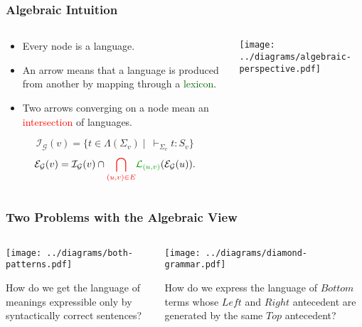 \documentclass{beamer}
\begin{document}
\begin{frame}
  \frametitle{Algebraic Intuition}

  \begin{columns}[c]
    \begin{column}{0.7\textwidth}
      \begin{block}{}
        \begin{itemize}
        \item Every node is a language.
        \item An arrow means that a language is produced from another by
          mapping through a \textcolor{darkgreen}{lexicon}.
        \item Two arrows converging on a node mean an
          \textcolor{red}{intersection} of languages.
        \end{itemize}
      \end{block}

$$
\mathcal{I}_{\mathcal{G}}(v) = \{t \in \Lambda(\Sigma_v)
\mid\ \vdash_{\Sigma_v} t : S_v\}
$$
$$
\mathcal{E}_{\mathcal{G}}(v) = \mathcal{I}_{\mathcal{G}}(v) \cap
\textcolor{red}{\bigcap_{(u,v) \in E}}
\textcolor{darkgreen}{\mathcal{L}_{(u,v)}}(\mathcal{E}_{\mathcal{G}}(u)).
$$
    \end{column}
    \begin{column}{0.3\textwidth}
      \texttt{[image: ../diagrams/algebraic-perspective.pdf]}
    \end{column}
  \end{columns}

\end{frame}


\begin{frame}
  \frametitle{Two Problems with the Algebraic View}

  \begin{columns}[t]
    \begin{column}{0.5\textwidth}
      \begin{center}
        \texttt{[image: ../diagrams/both-patterns.pdf]}
      \end{center}

      How do we get the language of meanings expressible only by
      syntactically correct sentences?
    \end{column}
    \begin{column}{0.5\textwidth}
      \begin{center}
        \texttt{[image: ../diagrams/diamond-grammar.pdf]}
      \end{center}

      How do we express the language of $Bottom$ terms whose $Left$ and
      $Right$ antecedent are generated by the same $Top$ antecedent?
    \end{column}
  \end{columns}
\end{frame}
\end{document}

